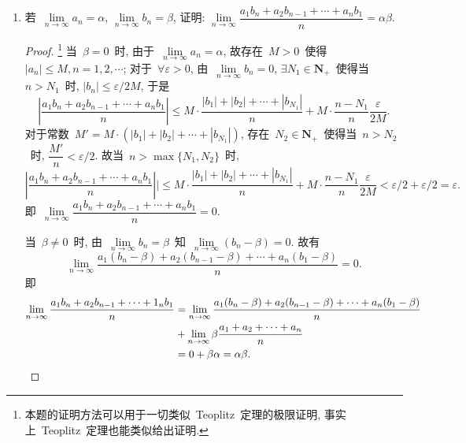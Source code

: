 \documentclass[UTF8,a4paper,10pt,twoside]{book}
\begin{document}
\begin{enumerate}
\begin{proof}
		      又由~$a_{n+1}=a_n(1-a_n)$, 同时取倒数就有
		      \[
			      \dfrac{1}{a_{n+1}}=\dfrac{1}{a_n(1-a_n)}=\dfrac{1}{a_n}+\dfrac{1}{1-a_n},
		      \]
		      故~$\lim\limits_{n\to\infty} \dfrac{1}{a_{n+1}}-\dfrac{1}{a_n}=\lim\limits_{n\to\infty} \dfrac{1}{1-a_n}=1$. 由~Cauchy~命题可知~$\lim\limits_{n\to\infty} \dfrac{1}{n}\sum\limits_{k=1}^{n-1}\left(\dfrac{1}{a_{k+1}}-\dfrac{1}{a_k}\right)=1$, 即~$\lim\limits_{n\to\infty}\left(\dfrac{1}{na_n}-\dfrac{1}{na_1}\right)=1$. 于是就有~$\lim\limits_{n\to\infty} \dfrac{1}{na_n}=1$, 故~$\lim\limits_{n\to\infty} na_n=1$.\qedhere
	      \end{proof}
	\item 若~$\lim\limits_{n\to\infty} a_n=\alpha$, $\lim\limits_{n\to\infty} b_n=\beta$, 证明: $\lim\limits_{n\to\infty} \dfrac{a_1b_n+a_2b_{n-1}+\cdots+a_nb_1}{n}=\alpha\beta$.
	      \begin{proof}
		      \footnote{本题的证明方法可以用于一切类似~Teoplitz~定理的极限证明, 事实上~Teoplitz~定理也能类似给出证明.}
		      当~$\beta=0$~时, 由于~$\lim\limits_{n\to\infty} a_n=\alpha$, 故存在~$M>0$~使得~$|a_n|\leqslant M, n=1,2,\cdots$; 对于~$\forall\varepsilon>0$, 由~$\lim\limits_{n\to\infty} b_n=0$, $\exists N_1\in\mathbf{N}_{+}$~使得当~$n>N_1$~时, $|b_n|\leqslant\varepsilon/2M$, 于是
		      \[
			      \left|\dfrac{a_1b_n+a_2b_{n-1}+\cdots+a_nb_1}{n}\right|\leqslant M\cdot\dfrac{|b_1|+|b_2|+\cdots+|b_{N_1}|}{n}+M\cdot\dfrac{n-N_1}{n}\dfrac{\varepsilon}{2M}.
		      \]
		      对于常数~$M'=M\cdot(|b_1|+|b_2|+\cdots+|b_{N_1}|)$, 存在~$N_2\in\mathbf{N}_{+}$~使得当~$n>N_2$~时, $\dfrac{M'}{n}<\varepsilon/2$. 故当~$n>\max\{N_1,N_2\}$~时,
		      \[
			      \left|\dfrac{a_1b_n+a_2b_{n-1}+\cdots+a_nb_1}{n}\right||\leqslant M\cdot\dfrac{|b_1|+|b_2|+\cdots+|b_{N_1}|}{n}+M\cdot\dfrac{n-N_1}{n}\dfrac{\varepsilon}{2M}<\varepsilon/2+\varepsilon/2=\varepsilon.
		      \]
		      即~$\lim\limits_{n\to\infty} \dfrac{a_1b_n+a_2b_{n-1}+\cdots+a_nb_1}{n}=0$.

		      当~$\beta\neq 0$~时, 由~$\lim\limits_{n\to\infty} b_n=\beta$~知~$\lim\limits_{n\to\infty} (b_n-\beta)=0$. 故有
		      \[
			      \lim\limits_{n\to\infty} \dfrac{a_1(b_n-\beta)+a_2(b_{n-1}-\beta)+\cdots+a_n(b_1-\beta)}{n}=0.
		      \]
		      即
		      \begin{equation*}
			      \begin{split}
				      \lim\limits_{n\to\infty} \dfrac{a_1b_n+a_2b_{n-1}+\cdots+1_nb_1}{n}&= \lim\limits_{n\to\infty} \dfrac{a_1(b_n-\beta)+a_2(b_{n-1}-\beta)+\cdots+a_n(b_1-\beta)}{n}\\
				      &+\lim\limits_{n\to\infty} \beta\dfrac{a_1+a_2+\cdots+a_n}{n}\\
				      &=0+\beta\alpha=\alpha\beta.\qedhere
			      \end{split}
		      \end{equation*}
	      \end{proof}
\end{enumerate}
\end{document}
